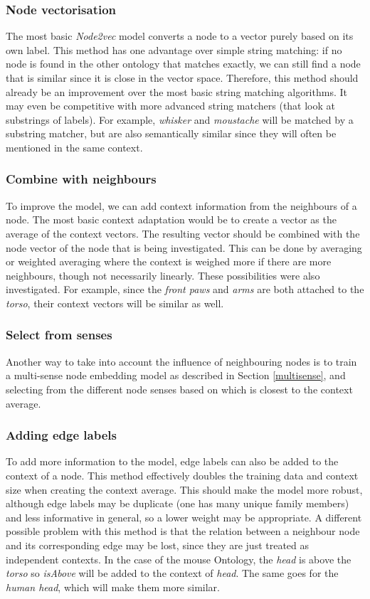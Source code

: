 \documentclass{article}
\begin{document}
  \subsubsection{Node vectorisation}
  The most basic \emph{Node2vec} model converts a node to a vector purely based on its own label. This method has one advantage over simple string matching: if no node is found in the other ontology that matches exactly, we can still find a node that is similar since it is close in the vector space. Therefore, this method should already be an improvement over the most basic string matching algorithms. It may even be competitive with more advanced string matchers (that look at substrings of labels). For example, \emph{whisker} and \emph{moustache} will be matched by a substring matcher, but are also semantically similar since they will often be mentioned in the same context.
  \subsubsection{Combine with neighbours}
  To improve the model, we can add context information from the neighbours of a node. The most basic context adaptation would be to create a vector as the average of the context vectors. The resulting vector should be combined with the node vector of the node that is being investigated. This can be done by averaging or weighted averaging where the context is weighed more if there are more neighbours, though not necessarily linearly. These possibilities were also investigated.
  For example, since the \emph{front paws} and \emph{arms} are both attached to the \emph{torso}, their context vectors will be similar as well.
  \subsubsection{Select from senses}
  Another way to take into account the influence of neighbouring nodes is to train a multi-sense node embedding model as described in Section \ref{multisense}, and selecting from the different node senses based on which is closest to the context average.
  \subsubsection{Adding edge labels}
  To add more information to the model, edge labels can also be added to the context of a node. This method effectively doubles the training data and context size when creating the context average. This should make the model more robust, although edge labels may be duplicate (one has many unique family members) and less informative in general, so a lower weight may be appropriate. A different possible problem with this method is that the relation between a neighbour node and its corresponding edge may be lost, since they are just treated as independent contexts.
  In the case of the mouse Ontology, the \emph{head} is above the \emph{torso} so \emph{isAbove} will be added to the context of \emph{head}. The same goes for the \emph{human head}, which will make them more similar.
\end{document}
